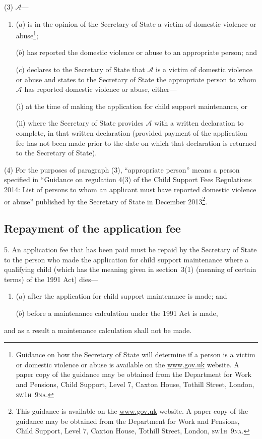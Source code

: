 \documentclass[12pt,a4paper]{article}
\begin{document}
(3) $\mathcal{A}$—
\begin{enumerate}\item[]
($a$) is in the opinion of the Secretary of State a victim of domestic violence or abuse\footnote{Guidance on how the Secretary of State will determine if a person is a victim or domestic violence or abuse is available on the \url{www.gov.uk} website. A paper copy of the guidance may be obtained from the Department for Work and Pensions, Child Support, Level 7, Caxton House, Tothill Street, London, \textsc{\lowercase{SW1H~9NA}}.};

($b$) has reported the domestic violence or abuse to an appropriate person; and

($c$) declares to the Secretary of State that $\mathcal{A}$ is a victim of domestic violence or abuse and states to the Secretary of State the appropriate person to whom $\mathcal{A}$ has reported domestic violence or abuse, either—

(i) at the time of making the application for child support maintenance, or

(ii) where the Secretary of State provides $\mathcal{A}$ with a written declaration to complete, in that written declaration (provided payment of the application fee has not been made prior to the date on which that declaration is returned to the Secretary of State).
\end{enumerate}

(4) For the purposes of paragraph (3), “appropriate person” means a person specified in “Guidance on regulation 4(3) of the Child Support Fees Regulations 2014: List of persons to whom an applicant must have reported domestic violence or abuse” published by the Secretary of State in December 2013\footnote{This guidance is available on the \url{www.gov.uk} website. A paper copy of the guidance may be obtained from the Department for Work and Pensions, Child Support, Level 7, Caxton House, Tothill Street, London, \textsc{\lowercase{SW1H~9NA}}.}.

\subsection[5. Repayment of the application fee]{Repayment of the application fee}

5.  An application fee that has been paid must be repaid by the Secretary of State to the person who made the application for child support maintenance where a qualifying child (which has the meaning given in section~3(1) (meaning of certain terms) of the 1991 Act) dies—
\begin{enumerate}\item[]
($a$) after the application for child support maintenance is made; and

($b$) before a maintenance calculation under the 1991 Act is made,
\end{enumerate}
and as a result a maintenance calculation shall not be made.
\end{document}
